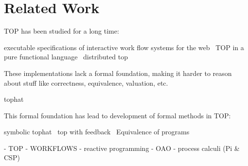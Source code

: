 
\section{Related Work}
\label{sec:relatedwork}

TOP has been studied for a long time:

executable specifications of interactive work flow systems for the web~\cite{conf/icfp/PlasmeijerAK07}
TOP in a pure functional language~\cite{conf/ppdp/PlasmeijerLMAK12}
distributed top~\cite{conf/ifl/OortgieseGAP17}

These implementations lack a formal foundation, making it harder to reason about stuff like correctness, equivalence, valuation, etc.

tophat~\cite{conf/ppdp/SteenvoordenNK19}

This formal foundation has lead to development of formal methods in TOP:

symbolic tophat~\cite{conf/ifl/NausSK19}
top with feedback~\cite{conf/sfp/NausS20}
Equivalence of programs~\cite{conf/sfp/KlijnsmaS22}

- TOP
- WORKFLOWS
- reactive programming
- OAO
- process calculi (Pi \& CSP)